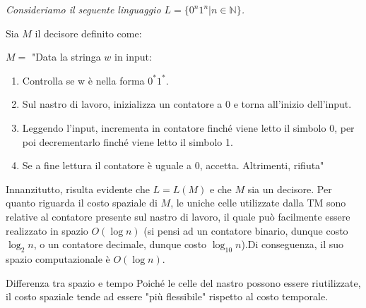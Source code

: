 \begin{Example}{}{}
\textit{Consideriamo il seguente linguaggio $L = \{0^n1^n | n\in \mathbb{N}\}$.}

Sia $M$ il decisore definito come:

$M =$ "Data la stringa $w$ in input:
\begin{enumerate}
    \item Controlla se w è nella forma $0^*1^*$.
    \item Sul nastro di lavoro, inizializza un contatore a 0 e torna all’inizio dell’input.
    \item Leggendo l’input, incrementa in contatore finché viene letto il simbolo 0, per poi decrementarlo finché viene letto il simbolo 1.
    \item Se a fine lettura il contatore è uguale a 0, accetta. Altrimenti, rifiuta"
\end{enumerate}
Innanzitutto, risulta evidente che $L = L(M)$ e che $M$ sia un decisore. Per quanto riguarda il costo spaziale di $M$, le uniche celle utilizzate dalla TM sono relative al contatore presente sul nastro di lavoro, il quale può facilmente essere realizzato in spazio $O(\log n)$ (si pensi ad un contatore binario, dunque costo $\log_2 n$, o un contatore decimale, dunque costo $\log_{10} n$).Di conseguenza, il suo spazio computazionale è $O(\log n)$.
\end{Example}

\begin{Osservation}{Differenza tra spazio e tempo}{}
Poiché le celle del nastro possono essere riutilizzate, il costo spaziale tende ad essere
"più flessibile" rispetto al costo temporale.
\end{Osservation}

